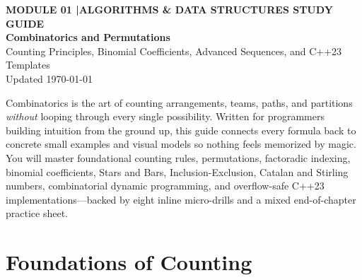 \documentclass[11pt,a4paper]{article}
\newcommand{\sectionbreak}{}
\theoremstyle{definition}
\begin{document}
\thispagestyle{plain}
\begin{tcolorbox}[
    enhanced,
    colback=primaryblue!6, colframe=primaryblue!20,
    borderline west={5pt}{0pt}{primaryblue},
    arc=4pt, boxrule=0.6pt,
    left=14pt, right=14pt, top=7pt, bottom=7pt,
    before skip=0pt, after skip=5pt
]
    {\footnotesize\bfseries\color{accentteal}MODULE 01 \quad|\quad ALGORITHMS \& DATA STRUCTURES STUDY GUIDE}\\[3pt]
    {\Huge\bfseries\color{primaryblue}Combinatorics and Permutations}\\[3pt]
    {\large\color{codegray}Counting Principles, Binomial Coefficients, Advanced Sequences, and C++23 Templates}\\[4pt]
    {\footnotesize\color{codegray}Updated \today}
\end{tcolorbox}

\begin{overviewbox}
{\small Combinatorics is the art of counting arrangements, teams, paths, and partitions \emph{without} looping through every single possibility. Written for programmers building intuition from the ground up, this guide connects every formula back to concrete small examples and visual models so nothing feels memorized by magic. You will master foundational counting rules, permutations, factoradic indexing, binomial coefficients, Stars and Bars, Inclusion-Exclusion, Catalan and Stirling numbers, combinatorial dynamic programming, and overflow-safe C++23 implementations---backed by eight inline micro-drills and a mixed end-of-chapter practice sheet.}
\end{overviewbox}

\vspace{-6pt}
{\setlength{\parskip}{0pt}\footnotesize
\titlespacing*{\section}{0pt}{2pt}{6pt}%
\makeatletter
\let\lm@orig@addvspace\addvspace
\renewcommand{\addvspace}[1]{\lm@orig@addvspace{0.20em plus 1pt}}
\makeatother
\tableofcontents}

\renewcommand{\sectionbreak}{\clearpage}

\section{Foundations of Counting}
\end{document}
